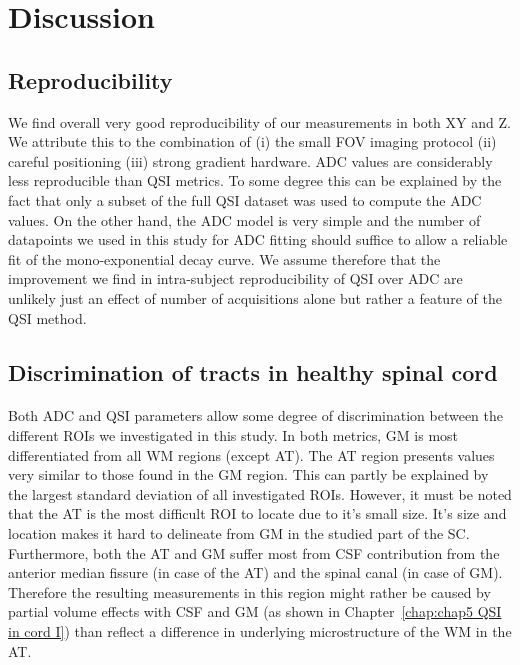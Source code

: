 \section{Discussion}
\subsection*{Reproducibility}
 We find overall very good reproducibility of our measurements in both XY and Z. We attribute this to the combination of (i) the small FOV imaging protocol (ii) careful positioning  (iii) strong gradient hardware. ADC values are considerably less reproducible than QSI metrics. To some degree this can be explained by the fact that only a subset of the full QSI dataset was used to compute the ADC values. On the other hand, the ADC model is very simple and the number of datapoints we used in this study for ADC fitting should suffice to allow a reliable fit of the mono-exponential decay curve. We assume therefore that the improvement we find in intra-subject reproducibility of QSI over ADC are unlikely just an effect of number of acquisitions alone but rather a feature of the QSI method.

\subsection*{Discrimination of tracts in healthy spinal cord}
\paragraph{} Both ADC and QSI parameters allow some degree of discrimination between the different ROIs we investigated in this study. In both metrics, GM is most differentiated from all WM regions (except AT). The AT region presents values very similar to those found in the GM region. This can partly be explained by the largest standard deviation of all investigated \glspl{ROI}. However, it must be noted that the AT is the most difficult \gls{ROI} to locate due to it's small size. It's size and location makes it hard to delineate from GM in the studied part of the \gls{SC}. Furthermore, both the AT and GM suffer most from \gls{CSF} contribution from the anterior median fissure (in case of the AT) and the spinal canal (in case of GM). Therefore the resulting measurements in this region might rather be caused by partial volume effects with \gls{CSF} and GM (as shown in Chapter~\ref{chap:chap5 QSI in cord I}) than reflect a difference in underlying microstructure of the WM in the AT.


